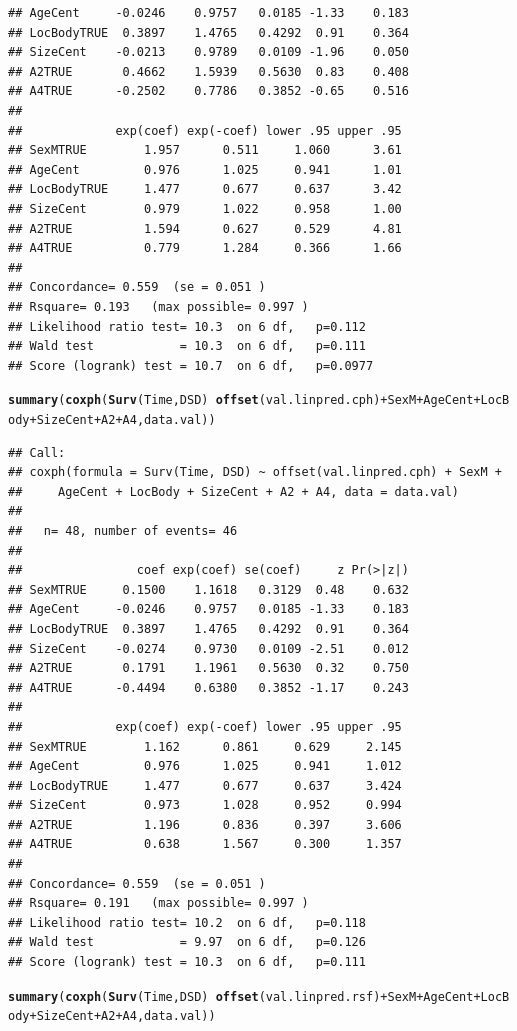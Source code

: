 \documentclass{article}\usepackage[]{graphicx}\usepackage[]{color}
\makeatletter
\newcommand{\hlopt}[1]{\textcolor[rgb]{0,0,0}{#1}}%
\newcommand{\hlstd}[1]{\textcolor[rgb]{0.345,0.345,0.345}{#1}}%
\newcommand{\hlkwd}[1]{\textcolor[rgb]{0.737,0.353,0.396}{\textbf{#1}}}%
\newenvironment{kframe}{%
 \def\at@end@of@kframe{}%
 \ifinner\ifhmode%
  \def\at@end@of@kframe{\end{minipage}}%
  \begin{minipage}{\columnwidth}%
 \fi\fi%
 \def\FrameCommand##1{\hskip\@totalleftmargin \hskip-\fboxsep
 \colorbox{shadecolor}{##1}\hskip-\fboxsep
     \hskip-\linewidth \hskip-\@totalleftmargin \hskip\columnwidth}%
 \MakeFramed {\advance\hsize-\width
   \@totalleftmargin\z@ \linewidth\hsize
   \@setminipage}}%
 {\par\unskip\endMakeFramed%
 \at@end@of@kframe}
\newenvironment{knitrout}{}{} %
\makeatother
\begin{document}
\begin{knitrout}
\begin{kframe}
\begin{verbatim}
## AgeCent     -0.0246    0.9757   0.0185 -1.33    0.183
## LocBodyTRUE  0.3897    1.4765   0.4292  0.91    0.364
## SizeCent    -0.0213    0.9789   0.0109 -1.96    0.050
## A2TRUE       0.4662    1.5939   0.5630  0.83    0.408
## A4TRUE      -0.2502    0.7786   0.3852 -0.65    0.516
## 
##             exp(coef) exp(-coef) lower .95 upper .95
## SexMTRUE        1.957      0.511     1.060      3.61
## AgeCent         0.976      1.025     0.941      1.01
## LocBodyTRUE     1.477      0.677     0.637      3.42
## SizeCent        0.979      1.022     0.958      1.00
## A2TRUE          1.594      0.627     0.529      4.81
## A4TRUE          0.779      1.284     0.366      1.66
## 
## Concordance= 0.559  (se = 0.051 )
## Rsquare= 0.193   (max possible= 0.997 )
## Likelihood ratio test= 10.3  on 6 df,   p=0.112
## Wald test            = 10.3  on 6 df,   p=0.111
## Score (logrank) test = 10.7  on 6 df,   p=0.0977
\end{verbatim}
\begin{alltt}
\hlkwd{summary}\hlstd{(}\hlkwd{coxph}\hlstd{(}\hlkwd{Surv}\hlstd{(Time, DSD)} \hlopt{~} \hlkwd{offset}\hlstd{(val.linpred.cph)} \hlopt{+} \hlstd{SexM} \hlopt{+} \hlstd{AgeCent} \hlopt{+} \hlstd{LocBody} \hlopt{+} \hlstd{SizeCent} \hlopt{+} \hlstd{A2} \hlopt{+} \hlstd{A4, data.val))}
\end{alltt}
\begin{verbatim}
## Call:
## coxph(formula = Surv(Time, DSD) ~ offset(val.linpred.cph) + SexM + 
##     AgeCent + LocBody + SizeCent + A2 + A4, data = data.val)
## 
##   n= 48, number of events= 46 
## 
##                coef exp(coef) se(coef)     z Pr(>|z|)
## SexMTRUE     0.1500    1.1618   0.3129  0.48    0.632
## AgeCent     -0.0246    0.9757   0.0185 -1.33    0.183
## LocBodyTRUE  0.3897    1.4765   0.4292  0.91    0.364
## SizeCent    -0.0274    0.9730   0.0109 -2.51    0.012
## A2TRUE       0.1791    1.1961   0.5630  0.32    0.750
## A4TRUE      -0.4494    0.6380   0.3852 -1.17    0.243
## 
##             exp(coef) exp(-coef) lower .95 upper .95
## SexMTRUE        1.162      0.861     0.629     2.145
## AgeCent         0.976      1.025     0.941     1.012
## LocBodyTRUE     1.477      0.677     0.637     3.424
## SizeCent        0.973      1.028     0.952     0.994
## A2TRUE          1.196      0.836     0.397     3.606
## A4TRUE          0.638      1.567     0.300     1.357
## 
## Concordance= 0.559  (se = 0.051 )
## Rsquare= 0.191   (max possible= 0.997 )
## Likelihood ratio test= 10.2  on 6 df,   p=0.118
## Wald test            = 9.97  on 6 df,   p=0.126
## Score (logrank) test = 10.3  on 6 df,   p=0.111
\end{verbatim}
\begin{alltt}
\hlkwd{summary}\hlstd{(}\hlkwd{coxph}\hlstd{(}\hlkwd{Surv}\hlstd{(Time, DSD)} \hlopt{~} \hlkwd{offset}\hlstd{(val.linpred.rsf)} \hlopt{+} \hlstd{SexM} \hlopt{+} \hlstd{AgeCent} \hlopt{+} \hlstd{LocBody} \hlopt{+} \hlstd{SizeCent} \hlopt{+} \hlstd{A2} \hlopt{+} \hlstd{A4, data.val))}
\end{alltt}



\end{kframe}
\end{knitrout}
\end{document}
